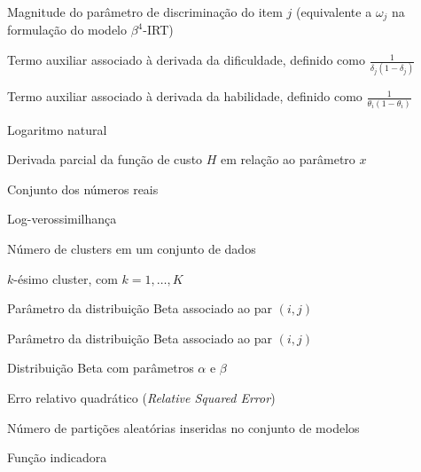 \begin{simbolos}
  \item[$w_j$] Magnitude do parâmetro de discriminação do item $j$ (equivalente a $\omega_j$ na formulação do modelo $\beta^4$-IRT)

\item[$\Delta(\delta_j)$] Termo auxiliar associado à derivada da dificuldade, definido como $\frac{1}{\delta_j (1-\delta_j)}$

\item[$\Theta(\theta_i)$] Termo auxiliar associado à derivada da habilidade, definido como $\frac{1}{\theta_i (1-\theta_i)}$

\item[$\ln(\cdot)$] Logaritmo natural

\item[$\frac{\partial H}{\partial x}$] Derivada parcial da função de custo $H$ em relação ao parâmetro $x$
  
  \item[$\mathbb{R}$] Conjunto dos números reais


  \item[$\ell(\cdot)$] Log-verossimilhança

  \item[$K$] Número de clusters em um conjunto de dados

  \item[$C_k$] $k$-ésimo cluster, com $k = 1, \dots, K$


  \item[$\alpha_{ij}$] Parâmetro da distribuição Beta associado ao par $(i,j)$

  \item[$\beta_{ij}$] Parâmetro da distribuição Beta associado ao par $(i,j)$

  \item[$\mathrm{Beta}(\alpha,\beta)$] Distribuição Beta com parâmetros $\alpha$ e $\beta$

  \item[$\mathrm{RSE}$] Erro relativo quadrático (\textit{Relative Squared Error})

  \item[$P$] Número de partições aleatórias inseridas no conjunto de modelos

  \item[$\mathbb{I}(\cdot)$] Função indicadora


\end{simbolos}

